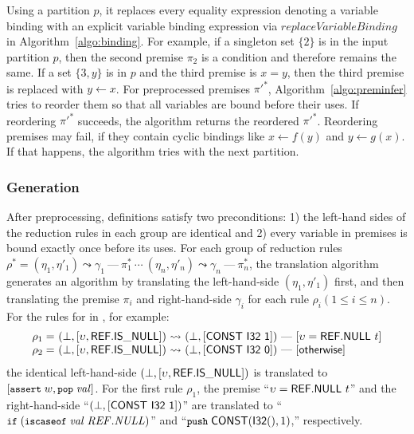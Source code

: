Using a partition $p$, it replaces every equality expression denoting a variable binding
with an explicit variable binding expression via $\mathit{replaceVariableBinding}$ in Algorithm~\ref{algo:binding}.
For example, if a singleton set $\{2\}$ is in the input partition $p$,
then the second premise $\pi_2$ is a condition and therefore remains the same.
If a set $\{3, y\}$ is in $p$ and the third premise is $x = y$,
then the third premise is replaced with $y \leftarrow x$.
For preprocessed premises $\pi'^*$, Algorithm~\ref{algo:preminfer} tries to reorder them
so that all variables are bound before their uses.
If reordering $\pi'^*$ succeeds, the algorithm returns the reordered $\pi'^*$.
Reordering premises may fail, if they contain cyclic bindings like $x \leftarrow f(y)$ and $y \leftarrow g(x)$.
If that happens, the algorithm tries with the next partition.

\subsubsection{\al Generation}
After preprocessing, \dl definitions satisfy two preconditions:
1) the left-hand sides of the reduction rules in each group
are identical and 2) every variable in premises is bound exactly once before its uses.
For each group of reduction rules $\rho^* =
(\eta_1, \eta' _1)  \leadsto \gamma_1\ \mbox{---}\ \pi_1^*\
\cdots\
(\eta_n, \eta' _n) \leadsto \gamma_n\ \mbox{---}\ \pi_n^*$,
the translation algorithm \dltoil generates an \al algorithm
by translating the left-hand-side $(\eta_1, \eta' _1)$ first,
and then translating the premise $\pi_i$ and right-hand-side $\gamma_i$
for each rule $\rho_i (1\le i\le n)$.
For the rules for \inblue{\ensuremath{\mathsf{ref.is\_null}}} in \dl, for example:
\[
\begin{array}{l@{~}l@{~}c@{~}l}
\rho_1 = &(\bot, [\upsilon, \ssf{REF.IS\_NULL}]) &\leadsto& (\bot, [\ssf{CONST\ I32\ 1}])\
\mbox{---}\ [\upsilon = \ssf{REF.NULL}\ t]\\
\rho_2 = &(\bot, [\upsilon, \ssf{REF.IS\_NULL}])&\leadsto&(\bot, [\ssf{CONST\ I32\ 0}])\
\mbox{---}\ [\ssf{\small otherwise}]
\end{array}
\]
the identical left-hand-side $(\bot, [\upsilon, \mathsf{REF.IS\_NULL}])$
is translated to $[\texttt{\small assert} \; w, \texttt{\small pop} \; \mathit{val}]$.
For the first rule $\rho_1$, the premise ``$\upsilon = \ssf{REF.NULL}\ t$'' and
the right-hand-side ``$(\bot, [\mathsf{CONST\ I32\ 1}])$'' are translated to
``$\texttt{\small if} \; (\texttt{\small iscaseof} \; \mathit{val} \; \mathit{REF.NULL})$'' and
``$\texttt{\small push} \; \mathsf{CONST}(\mathsf{I32}(), 1)$,'' respectively.

